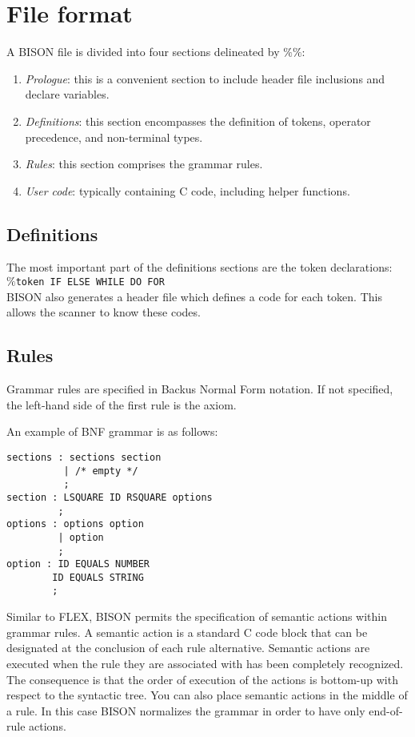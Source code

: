 \section{File format}

A BISON file is divided into four sections delineated by $\%\%$:
\begin{enumerate}
    \item \textit{Prologue}: this is a convenient section to include header file inclusions and declare variables.
    \item \textit{Definitions}: this section encompasses the definition of tokens, operator precedence, and non-terminal types.
    \item \textit{Rules}: this section comprises the grammar rules.
    \item \textit{User code}: typically containing C code, including helper functions.
\end{enumerate}

\subsection{Definitions}
The most important part of the definitions sections are the token declarations: \\
\texttt{$\%$token IF ELSE WHILE DO FOR} \\
BISON also generates a header file which defines a code for each token. 
This allows the scanner to know these codes.

\subsection{Rules}
Grammar rules are specified in Backus Normal Form notation.
If not specified, the left-hand side of the first rule is the axiom.
\begin{example}
    An example of BNF grammar is as follows:  \\
    \begin{lstlisting}[style=C]
sections : sections section
          | /* empty */
          ;
section : LSQUARE ID RSQUARE options
         ;
options : options option
         | option
         ;
option : ID EQUALS NUMBER
        ID EQUALS STRING
        ;
    \end{lstlisting}
\end{example}

Similar to FLEX, BISON permits the specification of semantic actions within grammar rules. 
A semantic action is a standard C code block that can be designated at the conclusion of each rule alternative.
Semantic actions are executed when the rule they are associated with has been completely recognized. 
The consequence is that the order of execution of the actions is bottom-up with respect to the syntactic tree. 
You can also place semantic actions in the middle of a rule.
In this case BISON normalizes the grammar in order to have only end-of-rule actions. 

